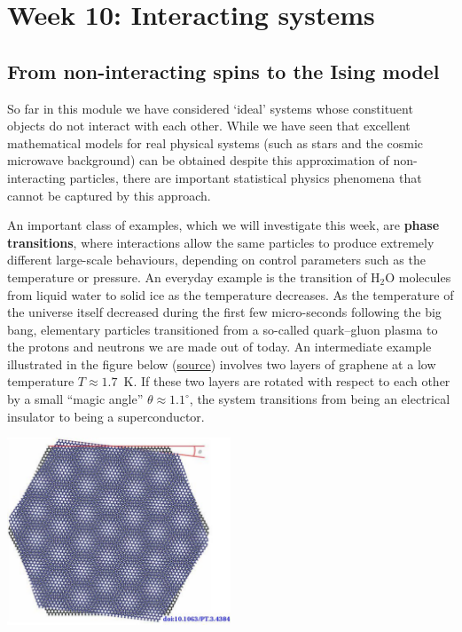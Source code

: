\renewcommand{\thisweek}{MATH327 Week 10}
\renewcommand{\moddate}{Last modified 4 May 2021}
\setcounter{section}{10}
\setcounter{subsection}{0}
{}
\section*{Week 10: Interacting systems}
\subsection{From non-interacting spins to the Ising model}
So far in this module we have considered `ideal' systems whose constituent objects do not interact with each other.
While we have seen that excellent mathematical models for real physical systems (such as stars and the cosmic microwave background) can be obtained despite this approximation of non-interacting particles, there are important statistical physics phenomena that cannot be captured by this approach.

An important class of examples, which we will investigate this week, are \textbf{phase transitions}, where interactions allow the same particles to produce extremely different large-scale behaviours, depending on control parameters such as the temperature or pressure.
An everyday example is the transition of H$_2$O molecules from liquid water to solid ice as the temperature decreases.
As the temperature of the universe itself decreased during the first few micro-seconds following the big bang, elementary particles transitioned from a so-called quark--gluon plasma to the protons and neutrons we are made out of today.
An intermediate example illustrated in the figure below (\href{https://doi.org/10.1063/PT.3.4384}{source}) involves two layers of graphene at a low temperature $T \approx 1.7$~K.
If these two layers are rotated with respect to each other by a small ``magic angle'' $\theta \approx 1.1^{\circ}$, the system transitions from being an electrical insulator to being a superconductor.

\begin{center}\includegraphics[width=0.5\textwidth]{figs/week10_graphene.pdf}\end{center}

